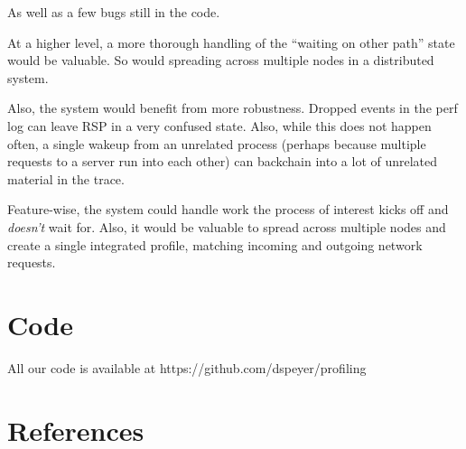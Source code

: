 \documentclass[10pt]{article}
\begin{document}
As well as a few bugs still in the code.

At a higher level, a more thorough handling of the ``waiting on other path'' state would be valuable.  So would spreading across multiple nodes in a distributed system.

Also, the system would benefit from more robustness.  Dropped events in the perf log can leave RSP in a very confused state.  Also, while this does not happen often, a single wakeup from an unrelated process (perhaps because multiple requests to a server run into each other) can backchain into a lot of unrelated material in the trace.

Feature-wise, the system could handle work the process of interest kicks off and \emph{doesn't} wait for.  Also, it would be valuable to spread across multiple nodes and create a single integrated profile, matching incoming and outgoing network requests.

\onecolumn

\section{Code}

All our code is available at https://github.com/dspeyer/profiling

\section{References}
\end{document}
